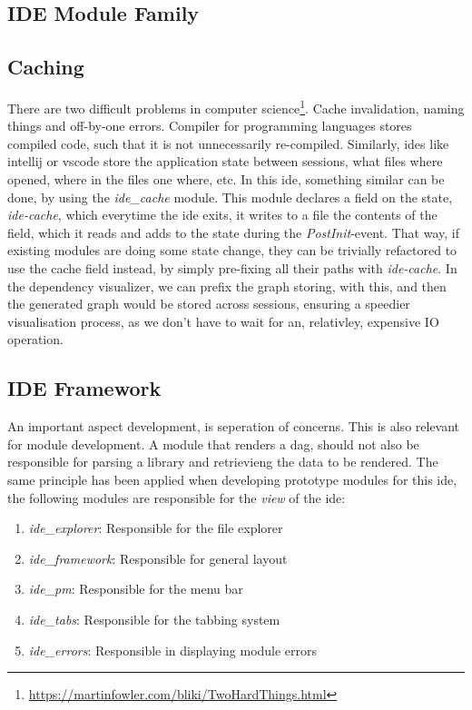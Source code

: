 \subsection{IDE Module Family}

\subsection{Caching}

There are two difficult problems in computer science\footnote{\url{https://martinfowler.com/bliki/TwoHardThings.html}}.
Cache invalidation, naming things and off-by-one errors. Compiler for
programming languages stores compiled code, such that it is not unnecessarily
re-compiled. Similarly, \gls{ide}s like \gls{intellij} or \gls{vscode} store the
application state between sessions, what files where opened, where in the files
one where, etc. In this \gls{ide}, something similar can be done, by using the
\textit{ide\_cache} module. This module declares a field on the state,
\textit{ide-cache}, which everytime the \gls{ide} exits, it writes to a file the
contents of the field, which it reads and adds to the state during the
\textit{PostInit}-event. That way, if existing modules are doing some state
change, they can be trivially refactored to use the cache field instead, by
simply pre-fixing all their paths with \textit{ide-cache}. In the dependency
visualizer, we can prefix the graph storing, with this, and then the generated
graph would be stored across sessions, ensuring a speedier visualisation
process, as we don't have to wait for an, relativley, expensive IO operation.

\subsection{IDE Framework}

An important aspect development, is seperation of concerns. This is also
relevant for module development. A module that renders a \gls{dag}, should not
also be responsible for parsing a library and retrievieng the data to be
rendered. The same principle has been applied when developing prototype modules
for this \gls{ide}, the following modules are responsible for the \textit{view}
of the \gls{ide}:

\begin{enumerate}
  \item \textit{ide\_explorer}: Responsible for the file explorer
  \item \textit{ide\_framework}: Responsible for general layout
  \item \textit{ide\_pm}: Responsible for the menu bar
  \item \textit{ide\_tabs}: Responsible for the tabbing system
  \item \textit{ide\_errors}: Responsible in displaying module errors
\end{enumerate}

